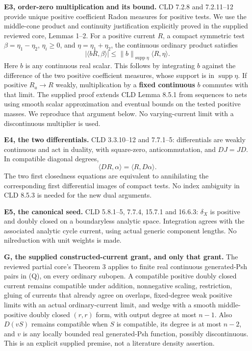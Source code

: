 \documentclass[
  11pt,
]{article}
\begin{document}
\textbf{E3, order-zero multiplication and its bound.} CLD 7.2.8 and
7.2.11--12 provide unique positive coefficient Radon measures for
positive tests. We use the middle-cone product and continuity
justification explicitly proved in the supplied reviewed core, Lemmas
1--2. For a positive current \(R\), a compact symmetric test
\(\beta=\eta_1-\eta_2\), \(\eta_i\geq0\), and \(\eta=\eta_1+\eta_2\),
the continuous ordinary product satisfies \[
 |\langle bR,\beta\rangle|\leq
       \|b\|_{\operatorname{supp}\eta}\langle R,\eta\rangle. \tag{1}
\] Here \(b\) is any continuous real scalar. This follows by integrating
\(b\) against the difference of the two positive coefficient measures,
whose support is in \(\operatorname{supp}\eta\). If positive
\(R_a\to R\) weakly, multiplication by a \textbf{fixed continuous} \(b\)
commutes with that limit. The supplied proof extends CLD Lemma 8.5.1
from sequences to nets using smooth scalar approximation and eventual
bounds on the tested positive masses. We reproduce that argument below.
No varying-current limit with a discontinuous multiplier is used.

\textbf{E4, the two differentials.} CLD 3.3.10--12 and 7.7.1--5:
differentials are weakly continuous and act in duality, with
square-zero, anticommutation, and \(DJ=JD\). In compatible diagonal
degrees,
\[\langle DR,\alpha\rangle=\langle R,D\alpha\rangle.          \tag{2}\]
The two first closedness equations are equivalent to annihilating the
corresponding first differential images of compact tests. No index
ambiguity in CLD 8.5.3 is needed for the new dual arguments.

\textbf{E5, the canonical seed.} CLD 5.8.1--5, 7.7.4, 15.7.1 and 16.6.3:
\(\delta_X\) is positive and doubly closed on a boundaryless analytic
space. Integration agrees with the associated analytic cycle current,
using actual generic component lengths. No nilreduction with unit
weights is made.

\textbf{G, the supplied constructed-current grant, and only that grant.}
The reviewed partial core's Theorem 3 applies to finite real continuous
generated-Psh pairs in (Q), on every ordinary subopen. A compatible
positive doubly closed current remains compatible under addition,
nonnegative scaling, restriction, gluing of currents that already agree
on overlaps, fixed-degree weak positive limits with an actual
ordinary-current limit, and wedge with a smooth middle-positive doubly
closed \((r,r)\) form, with output degree at most \(n-1\). Also
\(D(vS)\) remains compatible when \(S\) is compatible, its degree is at
most \(n-2\), and \(v\) is any locally bounded real generated-Psh
function, possibly discontinuous. This is an explicit supplied premise,
not a literature density assertion.
\end{document}
